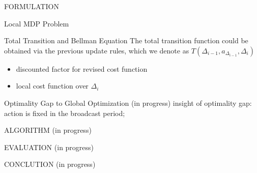 \documentclass[10pt, conference, letterpaper]{IEEEtran}
\begin{document}
\begin{section}{FORMULATION}
\begin{subsection}{Local MDP Problem}
            \begin{subsubsection}{Total Transition and Bellman Equation}
                The total transition function could be obtained via the previous update rules, which we denote as $T(\Delta_{i-1}, a_{\Delta_{i-1}}, \Delta_{i})$
                \begin{itemize}
                    \item discounted factor for revised cost function
                    \item local cost function over $\Delta_i$
                \end{itemize}
            \end{subsubsection}

            \begin{subsubsection}{Optimality Gap to Global Optimization}
                (in progress)
                insight of optimality gap: action is fixed in the broadcast period;
            \end{subsubsection}
        \end{subsection}

    \end{section}

    \begin{section}{ALGORITHM}
        \label{sec:algorithm}
        (in progress)
    \end{section}

    \begin{section}{EVALUATION}
        \label{sec:evaluation}
        (in progress)
    \end{section}

    \begin{section}{CONCLUTION}
        \label{sec:conclusion}
        (in progress)
    \end{section}

    
    
\end{document}
